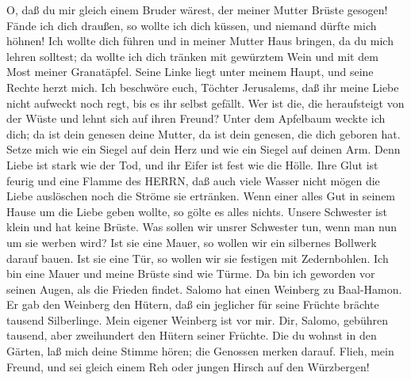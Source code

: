  O, daß du mir gleich einem Bruder wärest, der meiner Mutter
Brüste gesogen! Fände ich dich draußen, so wollte ich dich küssen, und
niemand dürfte mich höhnen!  Ich wollte dich führen und in
meiner Mutter Haus bringen, da du mich lehren solltest; da wollte ich
dich tränken mit gewürztem Wein und mit dem Most meiner Granatäpfel.
 Seine Linke liegt unter meinem Haupt, und seine Rechte
herzt mich.  Ich beschwöre euch, Töchter Jerusalems, daß ihr
meine Liebe nicht aufweckt noch regt, bis es ihr selbst gefällt.
 Wer ist die, die heraufsteigt von der Wüste und lehnt sich
auf ihren Freund? Unter dem Apfelbaum weckte ich dich; da ist dein
genesen deine Mutter, da ist dein genesen, die dich geboren hat.
 Setze mich wie ein Siegel auf dein Herz und wie ein Siegel
auf deinen Arm. Denn Liebe ist stark wie der Tod, und ihr Eifer ist fest
wie die Hölle. Ihre Glut ist feurig und eine Flamme des HERRN,
 daß auch viele Wasser nicht mögen die Liebe auslöschen noch
die Ströme sie ertränken. Wenn einer alles Gut in seinem Hause um die
Liebe geben wollte, so gölte es alles nichts.  Unsere
Schwester ist klein und hat keine Brüste. Was sollen wir unsrer
Schwester tun, wenn man nun um sie werben wird?  Ist sie
eine Mauer, so wollen wir ein silbernes Bollwerk darauf bauen. Ist sie
eine Tür, so wollen wir sie festigen mit Zedernbohlen.  Ich
bin eine Mauer und meine Brüste sind wie Türme. Da bin ich geworden vor
seinen Augen, als die Frieden findet.  Salomo hat einen
Weinberg zu Baal-Hamon. Er gab den Weinberg den Hütern, daß ein
jeglicher für seine Früchte brächte tausend Silberlinge. 
Mein eigener Weinberg ist vor mir. Dir, Salomo, gebühren tausend, aber
zweihundert den Hütern seiner Früchte.  Die du wohnst in
den Gärten, laß mich deine Stimme hören; die Genossen merken darauf.
 Flieh, mein Freund, und sei gleich einem Reh oder jungen
Hirsch auf den Würzbergen!
